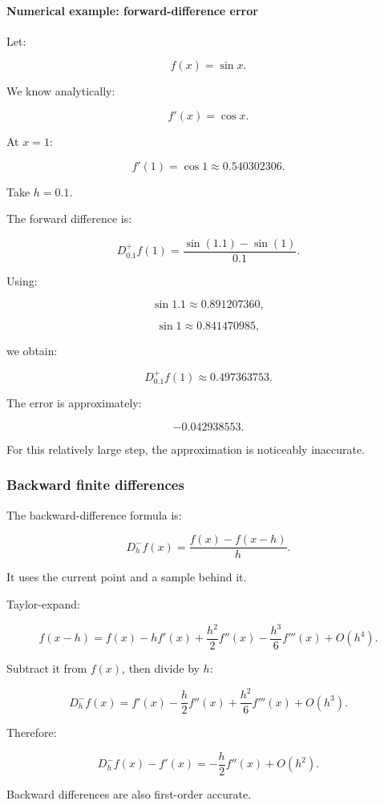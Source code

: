 \paragraph{Numerical example: forward-difference error}\label{02-foundations-ii-ch025-numerical-example-forward-difference-error}

Let:

\[
f(x)=\sin x.
\]

We know analytically:

\[
f'(x)=\cos x.
\]

At \(x=1\):

\[
f'(1)=\cos1\approx0.540302306.
\]

Take \(h=0.1\).

The forward difference is:

\[
D_{0.1}^+f(1)= \frac{\sin(1.1)-\sin(1)}{0.1}.
\]

Using:

\[
\sin1.1\approx0.891207360,
\]

\[
\sin1\approx0.841470985,
\]

we obtain:

\[
\boxed{ D_{0.1}^+f(1)\approx0.497363753 }.
\]

The error is approximately:

\[
-0.042938553.
\]

For this relatively large step, the approximation is noticeably inaccurate.

\subsubsection{Backward finite differences}\label{02-foundations-ii-ch025-backward-finite-differences}

The backward-difference formula is:

\[
\boxed{ D_h^-f(x)= \frac{f(x)-f(x-h)}h }.
\]

It uses the current point and a sample behind it.

Taylor-expand:

\[
f(x-h) = f(x)-hf'(x)+ \frac{h^2}{2}f''(x)- \frac{h^3}{6}f'''(x)+O(h^4).
\]

Subtract it from \(f(x)\), then divide by \(h\):

\[
D_h^-f(x) = f'(x)- \frac h2f''(x)+ \frac{h^2}{6}f'''(x)+O(h^3).
\]

Therefore:

\[
\boxed{ D_h^-f(x)-f'(x) = -\frac h2f''(x)+O(h^2) }.
\]

Backward differences are also first-order accurate.

